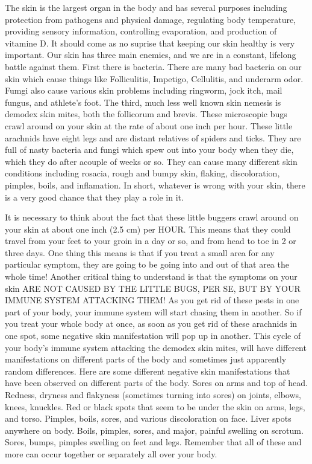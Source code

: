 \documentclass[12pt,letterpaper]{book}
\begin{document}
The skin is the largest organ in the body and has several purposes including protection from pathogens and physical damage, regulating body temperature, providing sensory information, controlling evaporation, and production of vitamine D. It should come as no suprise that keeping our skin healthy is very important. Our skin has three main enemies, and we are in a constant, lifelong battle against them. First there is bacteria. There are many bad bacteria on our skin which cause things like Folliculitis, Impetigo, Cellulitis, and underarm odor. Fumgi also cause various skin problems including ringworm, jock itch, mail fungus, and athlete's foot. The third, much less well known skin nemesis is demodex skin mites, both the follicorum and brevis. These microscopic bugs crawl around on your skin at the rate of about one inch per hour. These little arachnids have eight legs and are distant relatives of spiders and ticks. They are full of nasty bacteria and fungi which spew out into your body when they die, which they do after acouple of weeks or so. They can cause many different skin conditions including rosacia, rough and bumpy skin, flaking, discoloration, pimples, boils, and inflamation. In short, whatever is wrong with your skin, there is a very good chance that they play a role in it.

It is necessary to think about the fact that these little buggers crawl around on your skin at about one inch (2.5 cm) per HOUR. This means that they could travel from your feet to your groin in a day or so, and from head to toe in 2 or three days. One thing this means is that if you treat a small area for any particular symptom, they are going to be going into and out of that area the whole time! Another critical thing to understand is that the symptoms on your skin ARE NOT CAUSED BY THE LITTLE BUGS, PER SE, BUT BY YOUR IMMUNE SYSTEM ATTACKING THEM! As you get rid of these pests in one part of your body, your immune system will start chasing them in another. So if you treat your whole body at once, as soon as you get rid of these arachnids in one spot, some negative skin manifestation will pop up in another. This cycle of your body's immune system attacking the demodex skin mites, will have different manifestations on different parts of the body and sometimes just apparently random differences. Here are some different negative skin manifestations that have been observed on different parts of the body. Sores on arms and top of head. Redness, dryness and flakyness (sometimes turning into sores) on joints, elbows, knees, knuckles. Red or black spots that seem to be under the skin on arms, legs, and torso. Pimples, boils, sores, and various discoloration on face. Liver spots anywhere on body. Boils, pimples, sores, and major, painful swelling on scrotum. Sores, bumps, pimples swelling on feet and legs. Remember that all of these and more can occur together or separately all over your body.
\end{document}
